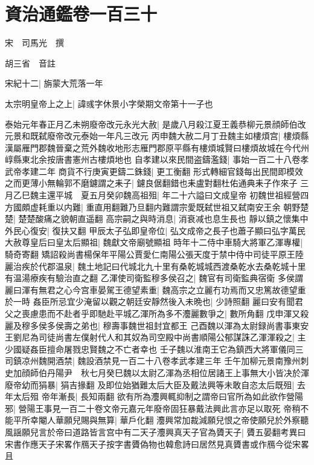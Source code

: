 \chapter{資治通鑑卷一百三十}
宋　司馬光　撰

胡三省　音註

宋紀十二|{
	旃蒙大荒落一年}


太宗明皇帝上之上|{
	諱彧字休景小字榮期文帝第十一子也}


泰始元年春正月乙未朔廢帝改元永光大赦|{
	是歲八月殺江夏王義恭柳元景顔師伯改元景和既弑廢帝改元泰始一年凡三改元}
丙申魏大赦二月丁丑魏主如樓煩宫|{
	樓煩縣漢屬雁門郡魏晉棄之荒外魏收地形志雁門郡原平縣有樓煩城賢曰樓煩故城在今代州崞縣東北余按唐書憲州古樓煩地也}
自孝建以來民間盗鑄濫錢|{
	事始一百二十八卷孝武帝孝建二年}
商貨不行庚寅更鑄二銖錢|{
	更工衡翻}
形式轉細官錢每出民間即模效之而更薄小無輪郭不磨鑢謂之耒子|{
	鑢良倨翻錯也耒盧對翻杜佑通典耒子作來子}
三月乙巳魏主還平城　夏五月癸卯魏高祖殂|{
	年二十六謚曰文成皇帝}
初魏世祖經營四方國頗虚耗重以内難|{
	重直用翻難乃旦翻内難謂宗愛既弑世祖又弑南安王余}
朝野楚楚|{
	楚楚酸痛之貌朝直遥翻}
高宗嗣之與時消息|{
	消衰减也息生長也}
靜以鎮之懷集中外民心復安|{
	復扶又翻}
甲辰太子弘即皇帝位|{
	弘文成帝之長子也蕭子顯曰弘字萬民}
大赦尊皇后曰皇太后顯祖|{
	魏獻文帝廟號顯祖}
時年十二侍中車騎大將軍乙渾專權|{
	騎奇寄翻}
矯詔殺尚書楊保年平陽公賈愛仁南陽公張天度于禁中侍中司徒平原王陸麗治疾於代郡温泉|{
	魏土地記曰代城北九十里有桑乾城城西渡桑乾水去桑乾城十里有温湯療疾有驗治直之翻}
乙渾使司衛監穆多侯召之|{
	魏官有司衛監典宿衛}
多侯謂麗曰渾有無君之心今宫車晏駕王德望素重|{
	魏高宗之立麗冇功焉而又忠篤故德望重於一時}
姦臣所忌宜少淹留以觀之朝廷安靜然後入未晩也|{
	少詩照翻}
麗曰安有聞君父之喪慮患而不赴者乎即馳赴平城乙渾所為多不灋麗數爭之|{
	數所角翻}
戊申渾又殺麗及穆多侯多侯壽之弟也|{
	穆壽事魏世祖封宜都王}
己酉魏以渾為太尉録尚書事東安王劉尼為司徒尚書左僕射代人和其奴為司空殿中尚書順陽公郁謀誅乙渾渾殺之|{
	主少國疑姦臣擅命屠戮忠賢魏之不亡者幸也}
壬子魏以淮南王它為鎮西大將軍儀同三司鎮凉州魏開酒禁|{
	魏設酒禁見一百二十八卷孝武孝建三年}
壬午加柳元景南豫州刺史加顔師伯丹陽尹　秋七月癸巳魏以太尉乙渾為丞相位居諸王上事無大小皆决於渾　廢帝幼而狷暴|{
	狷吉掾翻}
及即位始猶難太后大臣及戴法興等未敢自恣太后既殂|{
	去年太后殂}
帝年漸長|{
	長知兩翻}
欲有所為灋興輒抑制之謂帝曰官所為如此欲作營陽邪|{
	營陽王事見一百二十卷文帝元嘉元年廢帝固狂暴戴法興此言亦足以取死}
帝稍不能平所幸閹人華願兒賜與無算|{
	華戶化翻}
灋興常加裁減願兒恨之帝使願兒於外察聽風謡願兒言於帝曰道路皆言宫中有二天子灋興真天子官為贗天子|{
	贗五晏翻考異曰宋書作應天子宋畧作鴈天子按字書贗偽物也韓愈詩曰居然見真贗書或作鴈今從宋畧}
且

